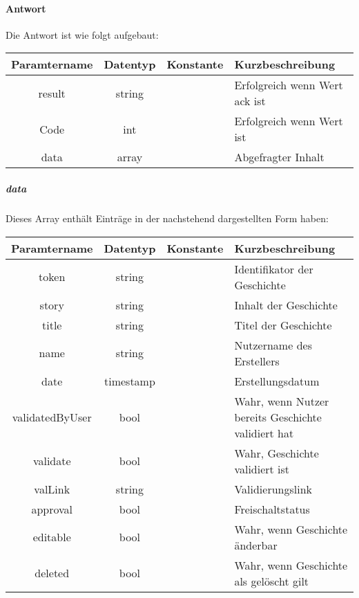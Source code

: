 \paragraph{Antwort}Die Antwort ist wie folgt aufgebaut:
\begin{table}[H]
	\begin{tabular}{|c|c|c|p{6.5cm}|}
		\hline
		\textbf{Paramtername} & \textbf{Datentyp} & \textbf{Konstante} & \textbf{Kurzbeschreibung}            \\ \hline                
		result              & string           &                 & Erfolgreich wenn Wert {\glqq ack\grqq} ist \\ \hline
		Code                & int              &                 & Erfolgreich wenn Wert {\glqq 0\grqq} ist \\ \hline
		data                & array            &                 & Abgefragter Inhalt \\ \hline
	\end{tabular}
\end{table}
\subparagraph{data}Dieses Array enthält Einträge in der nachstehend dargestellten Form haben:
\begin{table}[H]
	\begin{tabular}{|c|c|c|p{6.5cm}|}
		\hline
		\textbf{Paramtername} & \textbf{Datentyp} & \textbf{Konstante} & \textbf{Kurzbeschreibung}    \\ \hline
		token              & string            &                 & Identifikator der Geschichte \\ \hline
		story              & string            &                 & Inhalt der Geschichte \\ \hline
		title              & string            &                 & Titel der Geschichte \\ \hline
		name               & string            &                 & Nutzername des Erstellers \\ \hline
		date               & timestamp         &                 & Erstellungsdatum \\ \hline
		validatedByUser    & bool              &                 & Wahr, wenn Nutzer bereits Geschichte validiert hat \\ \hline
		validate           & bool              &                 & Wahr, Geschichte validiert ist \\ \hline
		valLink            & string            &                 & Validierungslink \\ \hline
		approval           & bool              &                 & Freischaltstatus \\ \hline
		editable           & bool              &                 & Wahr, wenn Geschichte änderbar \\ \hline
		deleted            & bool              &                 & Wahr, wenn Geschichte als gelöscht gilt \\ \hline
	\end{tabular}
\end{table}

